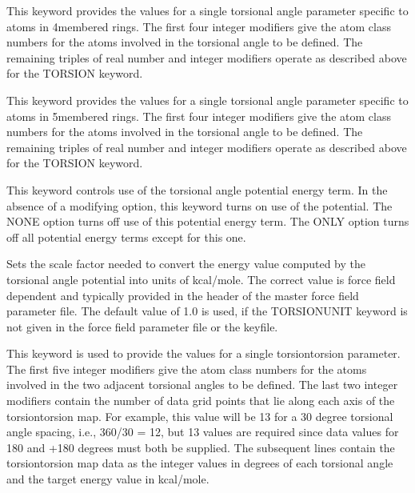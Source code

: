 \documentclass[letterpaper,11pt,english]{sphinxmanual}
\begin{document}
  This keyword provides the values for a single torsional angle parameter specific to atoms in 4\sphinxhyphen{}membered rings. The first four integer modifiers give the atom class numbers for the atoms involved in the torsional angle to be defined. The remaining triples of real number and integer modifiers operate as described above for the TORSION keyword.

  This keyword provides the values for a single torsional angle parameter specific to atoms in 5\sphinxhyphen{}membered rings. The first four integer modifiers give the atom class numbers for the atoms involved in the torsional angle to be defined. The remaining triples of real number and integer modifiers operate as described above for the TORSION keyword.

  This keyword controls use of the torsional angle potential energy term. In the absence of a modifying option, this keyword turns on use of the potential. The NONE option turns off use of this potential energy term. The ONLY option turns off all potential energy terms except for this one.

  Sets the scale factor needed to convert the energy value computed by the torsional angle potential into units of kcal/mole. The correct value is force field dependent and typically provided in the header of the master force field parameter file. The default value of 1.0 is used, if the TORSIONUNIT keyword is not given in the force field parameter file or the keyfile.

  This keyword is used to provide the values for a single torsion\sphinxhyphen{}torsion parameter. The first five integer modifiers give the atom class numbers for the atoms involved in the two adjacent torsional angles to be defined. The last two integer modifiers contain the number of data grid points that lie along each axis of the torsion\sphinxhyphen{}torsion map. For example, this value will be 13 for a 30 degree torsional angle spacing, i.e., 360/30 = 12, but 13 values are required since data values for \sphinxhyphen{}180 and +180 degrees must both be supplied. The subsequent lines contain the torsion\sphinxhyphen{}torsion map data as the integer values in degrees of each torsional angle and the target energy value in kcal/mole.
\end{document}
